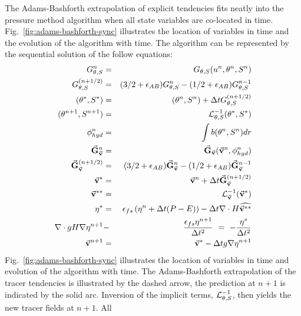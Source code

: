The Adams-Bashforth extrapolation of explicit tendencies fits neatly
into the pressure method algorithm when all state variables are
co-located in time. Fig.~\ref{fig:adams-bashforth-sync} illustrates
the location of variables in time and the evolution of the algorithm
with time. The algorithm can be represented by the sequential solution
of the follow equations:
\begin{eqnarray}
G_{\theta,S}^{n} & = & G_{\theta,S} ( u^n, \theta^n, S^n )
\label{eq:Gt-n-sync} \\
G_{\theta,S}^{(n+1/2)} & = & (3/2+\epsilon_{AB}) G_{\theta,S}^{n}-(1/2+\epsilon_{AB}) G_{\theta,S}^{n-1}
\label{eq:Gt-n+5-sync} \\
(\theta^*,S^*) & = & (\theta^{n},S^{n}) + \Delta t G_{\theta,S}^{(n+1/2)}
\label{eq:tstar-sync} \\
(\theta^{n+1},S^{n+1}) & = & {\cal L}^{-1}_{\theta,S} (\theta^*,S^*)
\label{eq:t-n+1-sync} \\
\phi^n_{hyd} & = & \int b(\theta^n,S^n) dr
\label{eq:phi-hyd-sync} \\
\vec{\bf G}_{\vec{\bf v}}^{n} & = & \vec{\bf G}_{\vec{\bf v}} ( \vec{\bf v}^n, \phi^n_{hyd} )
\label{eq:Gv-n-sync} \\
\vec{\bf G}_{\vec{\bf v}}^{(n+1/2)} & = & (3/2 + \epsilon_{AB} ) \vec{\bf G}_{\vec{\bf v}}^{n} - (1/2 + \epsilon_{AB} ) \vec{\bf G}_{\vec{\bf v}}^{n-1}
\label{eq:Gv-n+5-sync} \\
\vec{\bf v}^{*} & = & \vec{\bf v}^{n} + \Delta t \vec{\bf G}_{\vec{\bf v}}^{(n+1/2)}
\label{eq:vstar-sync} \\
\vec{\bf v}^{**} & = & {\cal L}_{\vec{\bf v}}^{-1} ( \vec{\bf v}^* )
\label{eq:vstarstar-sync} \\
\eta^* & = & \epsilon_{fs} \left( \eta^{n} + \Delta t (P-E) \right)- \Delta t 
  \nabla \cdot H \widehat{ \vec{\bf v}^{**} }
\label{eq:nstar-sync} \\
\nabla \cdot g H \nabla \eta^{n+1} & - & \frac{\epsilon_{fs} \eta^{n+1}}{\Delta t^2}
~ = ~ - \frac{\eta^*}{\Delta t^2}
\label{eq:elliptic-sync} \\
\vec{\bf v}^{n+1} & = & \vec{\bf v}^{*} - \Delta t g \nabla \eta^{n+1}
\label{eq:v-n+1-sync}
\end{eqnarray}
Fig.~\ref{fig:adams-bashforth-sync} illustrates the location of
variables in time and evolution of the algorithm with time. The
Adams-Bashforth extrapolation of the tracer tendencies is illustrated
by the dashed arrow, the prediction at $n+1$ is indicated by the
solid arc. Inversion of the implicit terms, ${\cal
L}^{-1}_{\theta,S}$, then yields the new tracer fields at $n+1$. All
